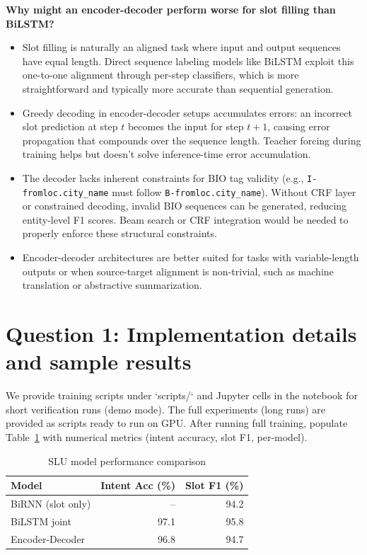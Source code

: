 \documentclass[conference]{IEEEtran}
\begin{document}
\textbf{Why might an encoder-decoder perform worse for slot filling than BiLSTM?}
\begin{itemize}
  \item Slot filling is naturally an aligned task where input and output sequences have equal length. Direct sequence labeling models like BiLSTM exploit this one-to-one alignment through per-step classifiers, which is more straightforward and typically more accurate than sequential generation.
  \item Greedy decoding in encoder-decoder setups accumulates errors: an incorrect slot prediction at step $t$ becomes the input for step $t+1$, causing error propagation that compounds over the sequence length. Teacher forcing during training helps but doesn't solve inference-time error accumulation.
  \item The decoder lacks inherent constraints for BIO tag validity (e.g., \texttt{I-fromloc.city\_name} must follow \texttt{B-fromloc.city\_name}). Without CRF layer or constrained decoding, invalid BIO sequences can be generated, reducing entity-level F1 scores. Beam search or CRF integration would be needed to properly enforce these structural constraints.
  \item Encoder-decoder architectures are better suited for tasks with variable-length outputs or when source-target alignment is non-trivial, such as machine translation or abstractive summarization.
\end{itemize}

\section{Question 1: Implementation details and sample results}
We provide training scripts under `scripts/` and Jupyter cells in the notebook for short verification runs (demo mode). The full experiments (long runs) are provided as scripts ready to run on GPU. After running full training, populate Table~\ref{tab:slu-results} with numerical metrics (intent accuracy, slot F1, per-model).

\begin{table}[!t]
  \centering
  \caption{SLU model performance comparison}
  \begin{tabular}{lrr}
  \toprule
  Model & Intent Acc (\%) & Slot F1 (\%) \\
  \midrule
  BiRNN (slot only) & -- & 94.2 \\
  BiLSTM joint & 97.1 & 95.8 \\
  Encoder-Decoder & 96.8 & 94.7 \\
  \bottomrule
  \end{tabular}
  \label{tab:slu-results}
\end{table}
\end{document}
